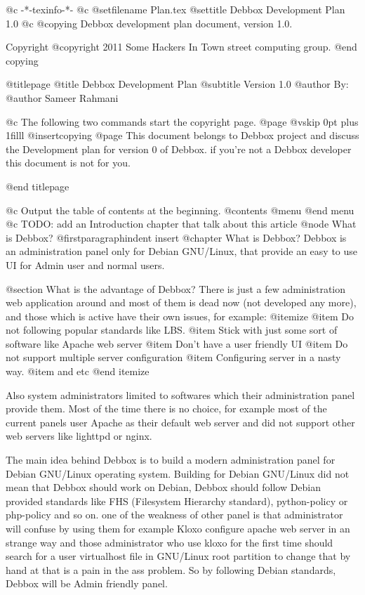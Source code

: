    @c -*-texinfo-*-
@c %
@setfilename Plan.tex
@settitle Debbox Development Plan 1.0
@c %
@copying
Debbox development plan document, version 1.0.

Copyright @copyright{} 2011 Some Hackers In Town street computing group.
@end copying

@titlepage
@title Debbox Development Plan
@subtitle Version 1.0
@author By:
@author Sameer Rahmani

@c The following two commands start the copyright page.
@page
@vskip 0pt plus 1filll
@insertcopying
@page
This document belongs to Debbox project and discuss the Development plan for version 0 of Debbox. if you're not 
a Debbox developer this document is not for you.

@end titlepage

@c Output the table of contents at the beginning.
@contents
@menu
@end menu
@c TODO: add an Introduction chapter that talk about this article
@node What is Debbox?
@firstparagraphindent insert
@chapter What is Debbox?
Debbox is an administration panel only for Debian GNU/Linux, that provide an easy to use UI for Admin user and normal users. 

@section What is the advantage of Debbox?
There is just a few administration web application around and most of them is dead now (not developed any more), and those
which is active have their own issues, for example:
@itemize
@item
Do not following popular standards like LBS.
@item
Stick with just some sort of software like Apache web server
@item
Don't have a user friendly UI
@item
Do not support multiple server configuration
@item 
Configuring server in a nasty way.
@item
and etc
@end itemize

Also system administrators limited to softwares which their administration panel provide them.
Most of the time there is no choice, for example most of the current panels user Apache as their
default web server and did not support other web servers like lighttpd or nginx.

The main idea behind Debbox is to build a modern administration panel for Debian GNU/Linux operating 
system. Building for Debian GNU/Linux did not mean that Debbox should work on Debian, Debbox should
follow Debian provided standards like FHS (Filesystem Hierarchy standard), python-policy or php-policy
and so on. one of the weakness of other panel is that administrator will confuse by using them for example
Kloxo configure apache web server in an strange way and those administrator who use kloxo for the first time
should search for a user virtualhost file in GNU/Linux root partition to change that by hand at that is a pain 
in the ass problem. So by following Debian standards, Debbox will be Admin friendly panel. 

